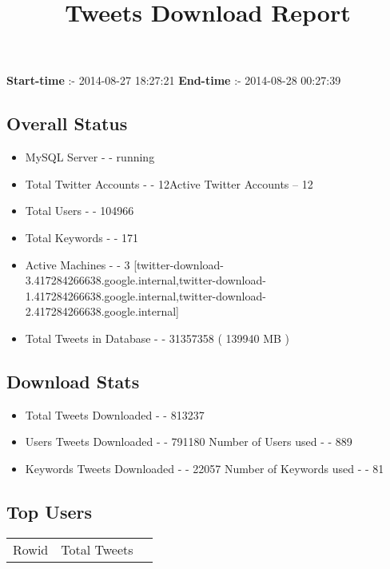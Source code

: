 \documentclass{article}\usepackage[T1]{fontenc}
\begin{document}
\title{\textbf{Tweets Download Report}}
               \date{}
                \maketitle
               \centerline{\textbf{Start-time} :- 2014-08-27 18:27:21 \hspace{40pt} \textbf{End-time} :- 2014-08-28 00:27:39}               \subsection*{Overall Status}                \begin{itemize}                \item MySQL Server - - running               \item Total Twitter Accounts - - 12\newline Active Twitter Accounts -- 12               \item Total Users - - 104966               \item Total Keywords - - 171               \item Active Machines - - 3 [twitter-download-3.417284266638.google.internal,twitter-download-1.417284266638.google.internal,twitter-download-2.417284266638.google.internal]               \item Total Tweets in Database - - 31357358 ( 139940 MB )               \end{itemize}               \subsection*{Download Stats}                \begin{itemize}                \item Total Tweets Downloaded - - 813237               \item Users Tweets Downloaded - - 791180 \newline Number of Users used - - 889               \item Keywords Tweets Downloaded - - 22057 \newline Number of Keywords used - - 81              \end{itemize}              \subsection*{Top Users}\begin{tabular}{|c|c|c|}         \hline         Rowid & Total Tweets \\ 

\end{tabular}
\end{document}
